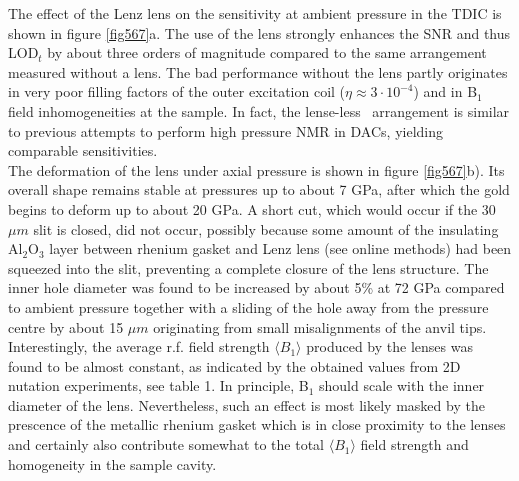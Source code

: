 \documentclass[aip,rsi,reprint,graphicx]{revtex4-1} %
\begin{document}
The effect of the Lenz lens on the sensitivity at ambient pressure in the TDIC is shown in figure \ref{fig567}a. The use of the lens strongly enhances the SNR and thus LOD$_t$ by about three orders of magnitude compared to the same arrangement measured without a lens. The bad performance without the lens partly originates in very poor filling factors of the outer excitation coil ($\eta\approx3\cdot10^{-4}$) and in B$_1$ field inhomogeneities at the sample. In fact, the \grqq lense-less\grqq~ arrangement is similar to previous attempts to perform high pressure NMR in DACs, yielding comparable sensitivities\cite{Pravica1998, Okuchi2005}.\\
The deformation of the lens under axial pressure is shown in figure \ref{fig567}b). Its overall shape remains stable at pressures up to about 7 GPa, after which the gold begins to deform up to about 20 GPa. A short cut, which would occur if the 30 $\mu m$ slit is closed, did not occur, possibly because some amount of the insulating Al$_2$O$_3$  layer between rhenium gasket and  Lenz lens (see online methods) had been squeezed into the slit, preventing a complete closure of the lens structure.
 The inner hole diameter was found to be increased by about 5\% at 72 GPa compared to ambient pressure together with a sliding of the hole away from the pressure centre by about 15 $\mu m$ originating from small misalignments of the anvil tips. Interestingly, the average r.f. field strength $\langle B_1\rangle$ produced by the lenses was found to be almost constant, as indicated by the obtained values from 2D nutation experiments, see table 1.  In principle, B$_1$ should scale with the inner diameter of the lens. Nevertheless, such an effect is most likely masked by the prescence of the metallic rhenium gasket which is in close proximity to the lenses and certainly also contribute somewhat to the total $\langle B_1\rangle$ field strength and homogeneity in the sample cavity.\\
\end{document}
